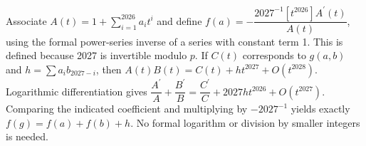 Associate $A(t)=1+\sum_{i=1}^{2026}a_it^i$ and define $\boxed{f (a) = - \dfrac{2027^{-1} [t^{2026}] A^{\prime} (t)}{A (t)}}$, using the formal power-series inverse of a series with constant term 1. This is defined because 2027 is invertible modulo $p$. If $C(t)$ corresponds to $g(a,b)$ and $h=\sum a_ib_{2027-i}$, then $A(t)B(t)=C(t)+ht^{2027}+O(t^{2028})$. Logarithmic differentiation gives $\dfrac{A^{\prime}}{A} + \dfrac{B^{\prime}}{B} = \dfrac{C^{\prime}}{C} + 2027 h t^{2026} + O (t^{2027})$. Comparing the indicated coefficient and multiplying by $-2027^{-1}$ yields exactly $f(g)=f(a)+f(b)+h$. No formal logarithm or division by smaller integers is needed.
